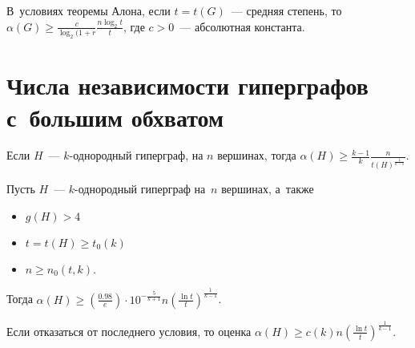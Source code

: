 \documentclass{article}
\begin{document}
\begin{corollary}
	В~условиях теоремы Алона, если $t = t(G)$~--- средняя степень, то $\alpha(G)
	\ge \frac{c}{\log_2 (1 + r} \frac{n \log_2 t}{t}$, где $c > 0$~--- абсолютная
	константа.
\end{corollary}

\section{Числа независимости гиперграфов с~большим обхватом}

\begin{corollary}
	Если $H$~--- $k$-однородный гиперграф, на $n$ вершинах, тогда
	$\alpha(H) \ge \frac{k-1}{k} \frac{n}{t(H)^{\frac{1}{k-1}}}$.
\end{corollary}

\begin{theorem}
	Пусть $H$~--- $k$-однородный гиперграф на~$n$ вершинах, а~также
	\begin{itemize}
		\item $g(H) > 4$
		\item $t = t(H) \ge t_0(k)$
		\item $n \ge n_0(t, k)$.
	\end{itemize}
	Тогда $\alpha(H) \ge \left(\frac{0.98}{e}\right) \cdot
	10^{-\frac{5}{k+1}} n \left( \frac{\ln t}{t} \right)^{\frac{1}{k-1}}$.

	Если отказаться от последнего условия, то оценка $\alpha(H) \ge c(k)
	n\left(\frac{\ln t}{t}\right)^\frac{1}{k-1}$.
\end{theorem}
\end{document}
